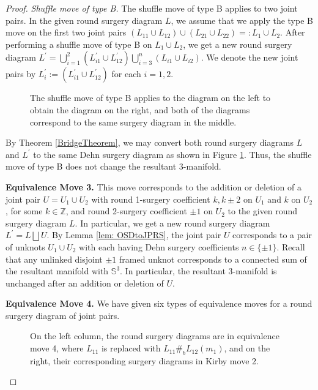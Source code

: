 \documentclass[10pt,a4paper]{amsart}
\newcommand{\s}{\mathbb{S}}
\begin{document}
\begin{proof}
{\it Shuffle move of type B.} The shuffle move of type B applies to two joint pairs. In the given round surgery diagram $L$, we assume that we apply the type B move on the first two joint pairs $(L_{11} \cup L_{12}) \cup (L_{21} \cup L_{22})=: L_1 \cup L_2$.
After performing a shuffle move of type B on $L_1 \cup L_2$, we get a new round surgery diagram $L^{\prime}= \bigcup_{i=1}^{2} (L^{\prime}_{i1}\cup L^{\prime}_{12}) \bigcup_{i=3}^{n} (L_{i1}\cup L_{i2})$. We denote the new joint pairs by $L^{\prime}_i:= (L^{\prime}_{i1}\cup L^{\prime}_{12})$ for each $i=1,2$. 
\begin{figure}[ht]
    
    \caption{The shuffle move of type B applies to the diagram on the left to obtain the diagram on the right, and both of the diagrams correspond to the same surgery diagram in the middle.}
    \label{fig:SMTBProof}
\end{figure}
By Theorem \ref{BridgeTheorem}, we may convert both round surgery diagrams $L$ and $L^{\prime}$ to the same Dehn surgery diagram as shown in Figure \ref{fig:SMTBProof}. 
Thus, the shuffle move of type B does not change the resultant 3-manifold. 


{\bf Equivalence Move 3.}
This move corresponds to the addition or deletion of a joint pair $U= U_1 \cup U_2$ with round 1-surgery coefficient $k, k\pm2$ on  $U_1$ and $k$ on $U_2$, for some $k\in \mathbb{Z}$, and round 2-surgery coefficient $\pm1$ on $U_2$ to the given round surgery diagram $L$.
In particular, we get a new round surgery diagram $L^{\prime}= L \bigsqcup U$. 
By Lemma \ref{lem: OSDtoJPRS}, the joint pair $U$ corresponds to a pair of unknots $U_1 \cup U_2$ with each having Dehn surgery coefficients $n \in \{\pm1\}$. 
Recall that any unlinked disjoint $\pm1$ framed unknot corresponds to a connected sum of the resultant manifold with $\s^3$. In particular, the resultant 3-manifold is unchanged after an addition or deletion of $U$. 

{\bf Equivalence Move 4.}
We have given six types of equivalence moves for a round surgery diagram of joint pairs. 
\begin{figure}[ht]
    \centering
    
    \caption{On the left column, the round surgery diagrams are in equivalence move 4, where $L_{11}$ is replaced with $L_{11}\#_b L_{12}(m_1)$, and on the right, their corresponding surgery diagrams in Kirby move 2.}
    \label{fig:EM4-1112-Proof}
\end{figure}


\end{proof}
\end{document}
